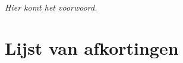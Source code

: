 \textit{Hier komt het voorwoord.}


%
%

\setlength\cftpartnumwidth{2em}

\newpage
\tableofcontents

\newpage


%
%

\listoffigures


%
%

\renewcommand{\lstlistlistingname}{Lijst van fragmenten}
\renewcommand{\lstlistingname}{Fragment}
\lstlistoflistings
{}


%
%

\chapter*{Lijst van afkortingen}

